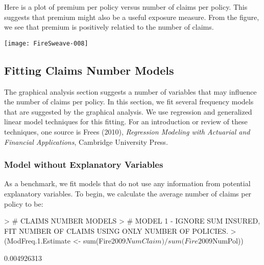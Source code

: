 \documentclass[12pt,letterpaper]{article}
\begin{document}
\newpage
Here is a plot of premium per policy versus number of claims per policy. This suggests that premium might
also be a useful exposure measure. From the figure, we see that premium is positively relatied to the number of claims.

\begin{center}
\begin{Schunk}
\end{Schunk}
\texttt{[image: FireSweave-008]}
\end{center}


\newpage

\subsection{Fitting Claims Number Models}

The graphical analysis section suggests a number of variables that may influence the number of claims per policy.
In this section, we fit several frequency models that are suggested by the graphical analysis.
We use regression and generalized linear model techniques for this fitting. For an introduction
or review of these techniques, one source is Frees (2010),
\textit{Regression Modeling with Actuarial and Financial Applications}, Cambridge University Press.


\subsubsection{Model without Explanatory Variables}

As a benchmark, we fit models that do not use any information from potential explanatory variables.
To begin, we calculate the average number of claims per policy to be:

\begin{Schunk}
\begin{Sinput}
> #  CLAIMS NUMBER MODELS
> #  MODEL 1 - IGNORE SUM INSURED, FIT NUMBER OF CLAIMS USING ONLY NUMBER OF POLICIES.
> (ModFreq.1.Estimate <- sum(Fire2009$NumClaim)/sum(Fire2009$NumPol))
\end{Sinput}
\begin{Soutput}
[1] 0.004926313
\end{Soutput}
\end{Schunk}
\end{document}
